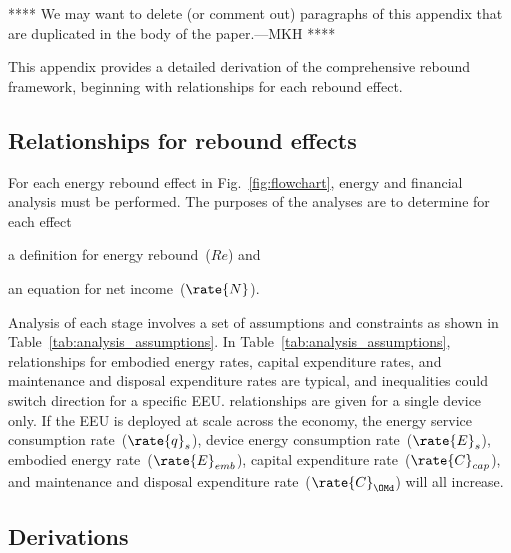 

**** 
We may want to delete (or comment out)
paragraphs of this appendix that are duplicated
in the body of the paper.---MKH
****

This appendix provides a detailed derivation of the comprehensive rebound framework,
beginning with relationships for each rebound effect.


\subsection{Relationships for rebound effects}
\label{sec:relationships_for_stages}

For each energy rebound effect in Fig.~\ref{fig:flowchart},
energy and financial analysis must be performed.
The purposes of the analyses are to determine for each effect
%
\begin{enumerate*}[label={(\alph*)}]

  \item a definition for energy rebound~($Re$) and

  \item an equation for net income~($\rate{N}$).

\end{enumerate*}

Analysis of each stage involves a set of assumptions and constraints
as shown in Table~\ref{tab:analysis_assumptions}.
In Table~\ref{tab:analysis_assumptions}, 
relationships for \empleffect{} 
embodied energy rates, 
capital expenditure rates, and 
maintenance and disposal expenditure rates
are typical, and
inequalities could switch direction for a specific EEU.
\Prodeffect{} relationships are given for a single device only.
If the EEU is deployed at scale across the economy, 
the energy service consumption rate~($\rate{q}_s$), 
device energy consumption rate~($\rate{E}_s$), 
embodied energy rate~($\rate{E}_{emb}$),
capital expenditure rate~($\rate{C}_{cap}$), and 
maintenance and disposal expenditure rate~($\rate{C}_{\OMd}$)
will all increase.




\subsection{Derivations}
\label{sec:derivations}

